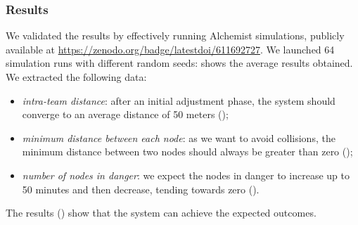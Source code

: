 \subsubsection{Results}
We validated the results by effectively running Alchemist simulations, 
 publicly available at \url{https://zenodo.org/badge/latestdoi/611692727}. 
%
We launched 64 simulation runs with different random seeds: 
  shows the average results obtained. 
We extracted the following data:
\begin{itemize}
  \item \emph{intra-team distance}:
   after an initial adjustment phase, 
   the system should converge to an average distance of 50 meters ();
  \item \emph{minimum distance between each node}: 
    as we want to avoid collisions, 
    the minimum distance between 
    two nodes should always be greater than zero ();
  \item \emph{number of nodes in danger}: 
   we expect the nodes in danger to increase 
   up to 50 minutes and then decrease, tending towards zero ().
\end{itemize}
The results () show that the system can achieve the expected outcomes.
